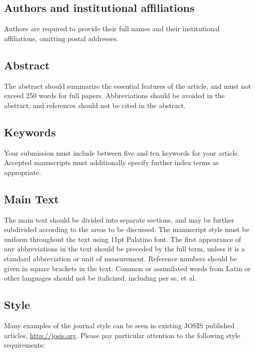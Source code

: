 \documentclass{josis}
\begin{document}
\subsection{Authors and institutional affiliations}
Authors are required to provide their full names and their institutional affiliations, omitting postal addresses.

\subsection{Abstract}
The abstract should summarize the essential features of the article, and must not exceed 250 words for full papers. Abbreviations should be avoided in the abstract, and references should not be cited in the abstract.

\subsection{Keywords}
Your submission must include between five and ten keywords for your article. Accepted manuscripts must additionally specify further index terms as appropriate.

\subsection{Main Text}
The main text should be divided into separate sections, and may be further subdivided according to the areas to be discussed. The manuscript style must be uniform throughout the text using 11pt Palatino font. The first appearance of any abbreviations in the text should be preceded by the full term, unless it is a standard abbreviation or unit of measurement. Reference numbers should be given in square brackets in the text. Common or assimilated words from Latin or other languages should not be italicized, including per se, et al.

\subsection{Style}

Many examples of the journal style can be seen in existing JOSIS published articles, \url{http://josis.org}. Please pay particular attention to the following style requirements:
\end{document}
